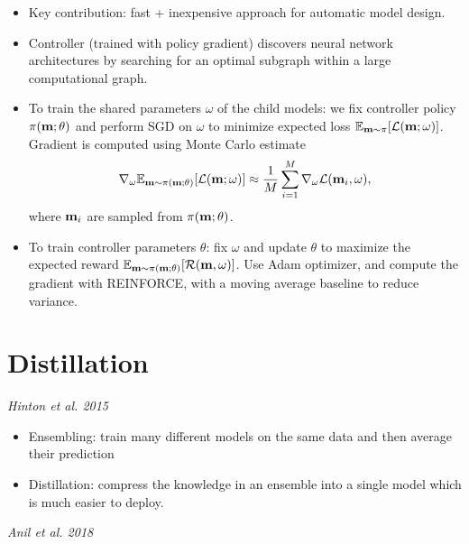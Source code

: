 \begin{itemize}
  \item Key contribution: fast + inexpensive approach for automatic model design.
  \item Controller (trained with policy gradient) discovers neural network architectures by searching for an optimal subgraph within a large computational graph.
  \item To train the shared parameters $\omega$ of the child models: we fix controller policy $\pi(\mathbf{m}; \theta)$ and perform SGD on $\omega$ to minimize expected loss $\mathbb{E}_{\mathbf{m} \sim \pi} [\mathcal{L} (\mathbf{m}; \omega)]$.  Gradient is computed using Monte Carlo estimate
   \[ 
     \nabla_{\omega} \mathbb{E}_{\mathbf{m} \sim \pi (\mathbf{m}; \theta)} [\mathcal{L} (\mathbf{m}; \omega)] \approx \frac{1}{M} \sum_{i=1}^{M} \nabla_{\omega} \mathcal{L}(\mathbf{m}_i, \omega),
   \]
   where $\mathbf{m}_i$ are sampled from $\pi(\mathbf{m}; \theta)$.

 \item To train controller parameters $\theta$: fix $\omega$ and update $\theta$ to maximize the expected reward $\mathbb{E}_{\mathbf{m} \sim \pi (\mathbf{m}; \theta)} [\mathcal{R}(\mathbf{m}, \omega)]$.  Use Adam optimizer, and compute the gradient with REINFORCE, with a moving average baseline to reduce variance.
\end{itemize}

\section{Distillation}

{\it Hinton et al. 2015}

\begin{itemize}
  \item Ensembling: train many different models on the same data and then average their prediction
  \item Distillation: compress the knowledge in an ensemble into a single model which is much easier to deploy.
\end{itemize}

{\it Anil et al. 2018}

